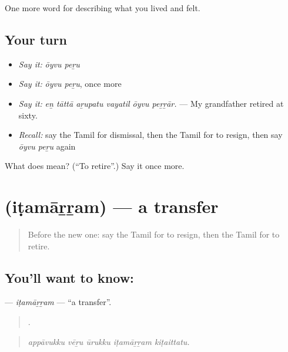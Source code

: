 \begin{grammarlens}[title={What you've built}]
One more word for describing what you lived and felt.
\end{grammarlens}

\subsection*{Your turn}
\begin{itemize}
\raggedright
  \item \emph{Say it:} \emph{ōyvu peṟu}
  \item \emph{Say it:} \emph{ōyvu peṟu}, once more
  \item \emph{Say it:} \emph{eṉ tāttā aṟupatu vayatil ōyvu peṟṟār.} — My grandfather retired at sixty.
  \item \emph{Recall:} say the Tamil for dismissal, then the Tamil for to resign, then say \emph{ōyvu peṟu} again
\end{itemize}

\begin{tcolorbox}[breakable,colback=teal!4,colframe=teal!35!black,title={Before you move on}]
What does   mean? (\textquotedblleft{}To retire\textquotedblright{}.) Say it once more.
\end{tcolorbox}
\section[\texorpdfstring{\ta{இடமாற்றம்} (iṭamāṟṟam)}{இடமாற்றம் (iṭamāṟṟam)}]{ (iṭamāṟṟam) — a transfer}

\label{lesson:TA-C512-itamarram}



\begin{quote}
Before the new one: say the Tamil for to resign, then the Tamil for to retire.
\end{quote}

\subsection*{You'll want to know: }
\textbf{} — \emph{iṭamāṟṟam} — \textquotedblleft{}a transfer\textquotedblright{}.

\begin{quote}
    .
\end{quote}

\begin{quote}
\emph{appāvukku vēṟu ūrukku iṭamāṟṟam kiṭaittatu.}
\end{quote}

